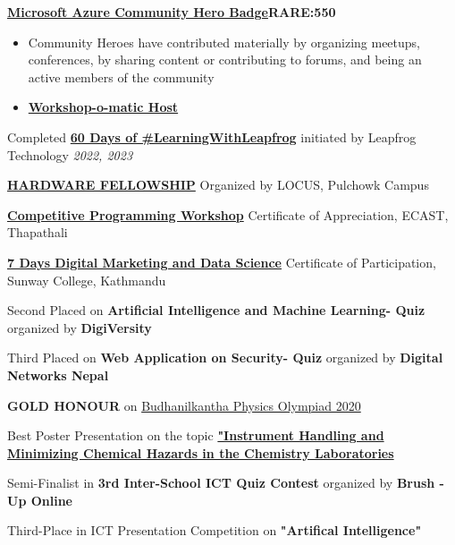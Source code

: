 \textbf{\href{}{Microsoft Azure Community Hero Badge}\hfill RARE:550}\par
\begin{itemize}
	\item Community Heroes have contributed materially by organizing meetups, conferences, by sharing content or contributing to forums, and being an active members of the community
	\item \textbf{\href{https://github.com/ompiepy/build-resume-website-MLSA}{Workshop-o-matic Host}}
\end{itemize}\par

Completed \textbf{\href{}{60 Days of \#LearningWithLeapfrog}} initiated by Leapfrog Technology \hfill \textit{2022, 2023}\par

\textbf{\href{}{HARDWARE FELLOWSHIP}} Organized by LOCUS, Pulchowk Campus \par

\textbf{\href{}{Competitive Programming Workshop}} Certificate of Appreciation, ECAST, Thapathali \par

\textbf{\href{}{7 Days Digital Marketing and Data Science}} Certificate of Participation, Sunway College, Kathmandu \par

Second Placed on \textbf{Artificial Intelligence and Machine Learning- Quiz} organized by \textbf{DigiVersity} \par


Third Placed on \textbf{Web Application on Security- Quiz} organized by \textbf{Digital Networks Nepal} \par

\textbf{GOLD HONOUR} on \href{https://drive.google.com/file/d/17SOHDAbzEdf6Iw4_3GvGAh4eLB2bKGNL/view?usp=sharing}{Budhanilkantha Physics Olympiad 2020} \par
Best Poster Presentation on the topic \textbf{\href{https://drive.google.com/file/d/1fUisY8y-jwK5h0eehxlQyjdiZApIxCt4/view?usp=sharing}{"Instrument Handling and Minimizing Chemical Hazards in the Chemistry Laboratories}} \par
Semi-Finalist in \textbf{3rd Inter-School ICT Quiz Contest} organized by \textbf{Brush -Up Online}\par
Third-Place in ICT Presentation Competition on \textbf{"Artifical Intelligence"}\par